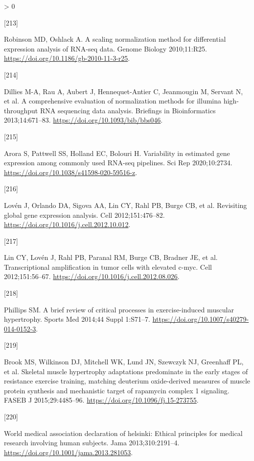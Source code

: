 \documentclass[twoside,10pt]{gihclass} %
\newlength{\cslhangindent}
\newlength{\csllabelwidth}
\newenvironment{CSLReferences}[3] %
 {%
  \setlength{\parindent}{0pt}
  \ifodd #1 \everypar{\setlength{\hangindent}{\cslhangindent}}\ignorespaces\fi
  \ifnum #2 > 0
  \setlength{\parskip}{#2\baselineskip}
  \fi
 }%
 {}
\newcommand{\CSLLeftMargin}[1]{\parbox[t]{\maxof{\widthof{#1}}{\csllabelwidth}}{#1}}
\newcommand{\CSLRightInline}[1]{\parbox[t]{\linewidth}{#1}}
\begin{document}
\begin{CSLReferences}{0}{0}
\leavevmode\hypertarget{ref-RN2414}{}%
\CSLLeftMargin{{[}213{]} }
\CSLRightInline{Robinson MD, Oshlack A. A scaling normalization method for differential expression analysis of RNA-seq data. Genome Biology 2010;11:R25. \url{https://doi.org/10.1186/gb-2010-11-3-r25}.}

\leavevmode\hypertarget{ref-RN2363}{}%
\CSLLeftMargin{{[}214{]} }
\CSLRightInline{Dillies M-A, Rau A, Aubert J, Hennequet-Antier C, Jeanmougin M, Servant N, et al. A comprehensive evaluation of normalization methods for illumina high-throughput RNA sequencing data analysis. Briefings in Bioinformatics 2013;14:671--83. \url{https://doi.org/10.1093/bib/bbs046}.}

\leavevmode\hypertarget{ref-RN2757}{}%
\CSLLeftMargin{{[}215{]} }
\CSLRightInline{Arora S, Pattwell SS, Holland EC, Bolouri H. Variability in estimated gene expression among commonly used RNA-seq pipelines. Sci Rep 2020;10:2734. \url{https://doi.org/10.1038/s41598-020-59516-z}.}

\leavevmode\hypertarget{ref-RN2359}{}%
\CSLLeftMargin{{[}216{]} }
\CSLRightInline{Lovén J, Orlando DA, Sigova AA, Lin CY, Rahl PB, Burge CB, et al. Revisiting global gene expression analysis. Cell 2012;151:476--82. \url{https://doi.org/10.1016/j.cell.2012.10.012}.}

\leavevmode\hypertarget{ref-RN2430}{}%
\CSLLeftMargin{{[}217{]} }
\CSLRightInline{Lin CY, Lovén J, Rahl PB, Paranal RM, Burge CB, Bradner JE, et al. Transcriptional amplification in tumor cells with elevated c-myc. Cell 2012;151:56--67. \url{https://doi.org/10.1016/j.cell.2012.08.026}.}

\leavevmode\hypertarget{ref-RN1272}{}%
\CSLLeftMargin{{[}218{]} }
\CSLRightInline{Phillips SM. A brief review of critical processes in exercise-induced muscular hypertrophy. Sports Med 2014;44 Suppl 1:S71--7. \url{https://doi.org/10.1007/s40279-014-0152-3}.}

\leavevmode\hypertarget{ref-RN1642}{}%
\CSLLeftMargin{{[}219{]} }
\CSLRightInline{Brook MS, Wilkinson DJ, Mitchell WK, Lund JN, Szewczyk NJ, Greenhaff PL, et al. Skeletal muscle hypertrophy adaptations predominate in the early stages of resistance exercise training, matching deuterium oxide-derived measures of muscle protein synthesis and mechanistic target of rapamycin complex 1 signaling. FASEB J 2015;29:4485--96. \url{https://doi.org/10.1096/fj.15-273755}.}

\leavevmode\hypertarget{ref-RN2548}{}%
\CSLLeftMargin{{[}220{]} }
\CSLRightInline{World medical association declaration of helsinki: Ethical principles for medical research involving human subjects. Jama 2013;310:2191--4. \url{https://doi.org/10.1001/jama.2013.281053}.}


\end{CSLReferences}
\end{document}
